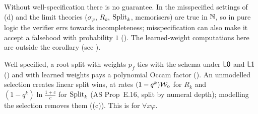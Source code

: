 Without well-specification there is no guarantee. In the misspecified settings of (d) and  the limit theories ($\sigma_\varphi$, $R_k$, $\mathrm{Split}_k$, memorisers) are true in $\mathbb{N}$, so in pure logic the verifier errs towards incompleteness; misspecification can also make it accept a falsehood with probability $1$ (). The learned-weight computations here are outside the corollary (see ).

\begin{remark}\label{rem:univ:mdl}
Well specified, a root split with weights $p_f$ ties with the schema under $\mathord{\mathsf{L0}}$ and $\mathord{\mathsf{L1}}$ () and with learned weights pays a polynomial Occam factor (). An unmodelled selection creates linear split wins, at rates $(1-q^k)\mathcal{W}_{\mathrm{o}}$ for $R_k$ and $(1-q^k)\ln\frac{1+c}c$ for $\mathrm{Split}_k$ (AS Prop~E.16, split by numeral depth); modelling the selection removes them ((c)). This is  for $\forall x\varphi$.
\end{remark}
